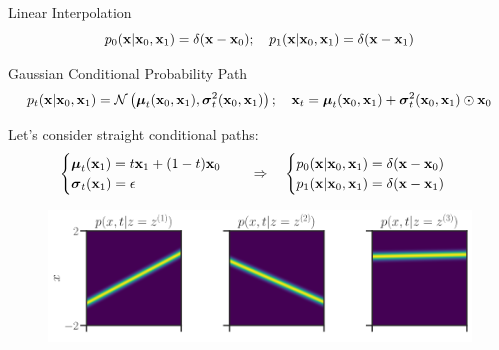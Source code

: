 \documentclass{beamer}
\begin{document}
\begin{frame}{Linear Interpolation}
	\[
		p_0(\mathbf{x} | \mathbf{x}_0, \mathbf{x}_1) = \delta(\mathbf{x} - \mathbf{x}_0); \quad p_1(\mathbf{x} | \mathbf{x}_0, \mathbf{x}_1) = \delta(\mathbf{x} - \mathbf{x}_1)
	\]
	
	\begin{block}{Gaussian Conditional Probability Path}
		\vspace{-0.5cm}
		{\small
		\[
			p_t(\mathbf{x} | \mathbf{x}_0, \mathbf{x}_1) = \mathcal{N}\left(\boldsymbol{\mu}_t(\mathbf{x}_0, \mathbf{x}_1), \boldsymbol{\sigma}_t^2(\mathbf{x}_0, \mathbf{x}_1)\right); \quad \mathbf{x}_t = \boldsymbol{\mu}_t(\mathbf{x}_0, \mathbf{x}_1) +  \boldsymbol{\sigma}_t^2(\mathbf{x}_0, \mathbf{x}_1) \odot \mathbf{x}_0
		\]
		}
		\vspace{-0.6cm}
	\end{block}
	Let's consider straight conditional paths:	
	\[
		\begin{cases}
			\boldsymbol{\mu}_t(\mathbf{x}_1) = t \mathbf{x}_1 + (1 - t) \mathbf{x}_0 \\
			\boldsymbol{\sigma}_t(\mathbf{x}_1) = \epsilon
		\end{cases}
		\quad \Rightarrow \quad 
		\begin{cases}
			p_0(\mathbf{x} | \mathbf{x}_0, \mathbf{x}_1) = \delta(\mathbf{x} - \mathbf{x}_0) \\
			p_1(\mathbf{x} | \mathbf{x}_0, \mathbf{x}_1) = \delta(\mathbf{x} - \mathbf{x}_1)
		\end{cases}
	\]
	\vspace{-0.3cm}
	\begin{figure}
		\centering
		\includegraphics[width=\linewidth]{figs/linear_paths}
	\end{figure}
\end{frame}
\end{document}
